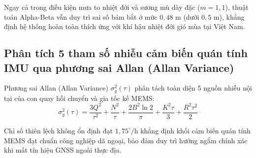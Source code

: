 Ngay cả trong điều kiện mưa to nhiệt đới và sương mù dày đặc ($m = 1{,}1$), thuật toán Alpha-Beta vẫn duy trì sai số bám bắt ở mức $0{,}48$ m (dưới $0{,}5$ m), khẳng định hệ thống hoàn toàn thích ứng với khí hậu nhiệt đới gió mùa tại Việt Nam.

\subsection{Phân tích 5 tham số nhiễu cảm biến quán tính IMU qua phương sai Allan (Allan Variance)}

\hspace{0.5cm} Phương sai Allan (Allan Variance) $\sigma_y^2(\tau)$ phân tách toàn diện 5 nguồn nhiễu nội tại của con quay hồi chuyển và gia tốc kế MEMS:
\begin{equation}
\sigma_y^2(\tau) = \frac{3 Q^2}{\tau^2} + \frac{N^2}{\tau} + \frac{2 B^2 \ln 2}{\pi} + \frac{K^2 \tau}{3} + \frac{R^2 \tau^2}{2}
\label{eq:allan-variance-decomposition}
\end{equation}

\begin{table}[H]
\centering
\caption{Mô hình hóa 5 tham số phương sai Allan của khối cảm biến quán tính 9 trục IMU theo datasheet}
\label{tab:allan-variance-noise-parameters}
\end{table}

Chỉ số thiên lệch không ổn định đạt $1{,}75^\circ/\text{h}$ khẳng định khối cảm biến quán tính MEMS đạt chuẩn công nghiệp dã ngoại, bảo đảm duy trì hướng ngắm chính xác khi mất tín hiệu GNSS ngoài thực địa.

